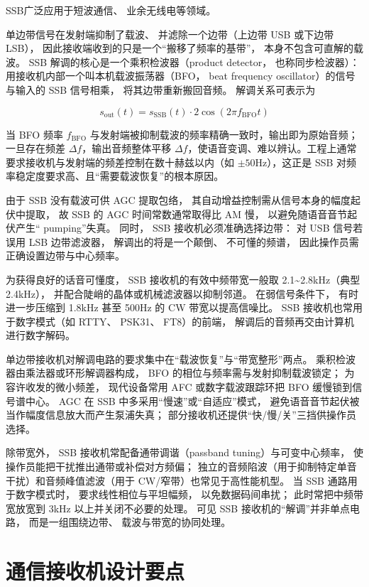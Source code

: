 SSB广泛应用于短波通信、
业余无线电等领域。

单边带信号在发射端抑制了载波、
并滤除一个边带（上边带 USB 或下边带 LSB），
因此接收端收到的只是一个“搬移了频率的基带”，
本身不包含可直解的载波。
SSB 解调的核心是一个乘积检波器（product detector，
也称同步检波器）：
用接收机内部一个叫本机载波振荡器（BFO，
beat frequency oscillator）的信号与输入的 SSB 信号相乘，
将其边带重新搬回音频。
解调关系可表示为

\[
s_{\mathrm{out}}(t)=s_{\mathrm{SSB}}(t)\cdot 2\cos(2\pi f_{\mathrm{BFO}} t)
\]

当 BFO 频率 $f_{\mathrm{BFO}}$ 与发射端被抑制载波的频率精确一致时，输出即为原始音频；一旦存在频差 $\Delta f$，输出音频整体平移 $\Delta f$，使语音变调、难以辨认。工程上通常要求接收机与发射端的频差控制在数十赫兹以内（如 $\pm50$Hz），这正是 SSB 对频率稳定度要求高、且“需要载波恢复”的根本原因。

由于 SSB 没有载波可供 AGC 提取包络，
其自动增益控制需从信号本身的幅度起伏中提取，
故 SSB 的 AGC 时间常数通常取得比 AM 慢，
以避免随语音音节起伏产生“ pumping”失真。
同时，
SSB 接收机必须准确选择边带：
对 USB 信号若误用 LSB 边带滤波器，
解调出的将是一个颠倒、
不可懂的频谱，
因此操作员需正确设置边带与中心频率。

为获得良好的话音可懂度，
SSB 接收机的有效中频带宽一般取 2.1\sim2.8kHz（典型 2.4kHz），
并配合陡峭的晶体或机械滤波器以抑制邻道。
在弱信号条件下，
有时进一步压缩到 1.8kHz 甚至 500Hz 的 CW 带宽以提高信噪比。
SSB 接收机也常用于数字模式（如 RTTY、
PSK31、
FT8）的前端，
解调后的音频再交由计算机进行数字解码。

单边带接收机对解调电路的要求集中在“载波恢复”与“带宽整形”两点。
乘积检波器由乘法器或环形解调器构成，
BFO 的相位与频率需与发射抑制载波锁定；
为容许收发的微小频差，
现代设备常用 AFC 或数字载波跟踪环把 BFO 缓慢锁到信号谱中心。
AGC 在 SSB 中多采用“慢速”或“自适应”模式，
避免语音音节起伏被当作幅度信息放大而产生泵浦失真；
部分接收机还提供“快/慢/关”三挡供操作员选择。

除带宽外，
SSB 接收机常配备通带调谐（passband tuning）与可变中心频率，
使操作员能把干扰推出通带或补偿对方频偏；
独立的音频陷波（用于抑制特定单音干扰）和音频峰值滤波（用于 CW/窄带）也常见于高性能机型。
当 SSB 通路用于数字模式时，
要求线性相位与平坦幅频，
以免数据码间串扰；
此时常把中频带宽放宽到 3kHz 以上并关闭不必要的处理。
可见 SSB 接收机的“解调”并非单点电路，
而是一组围绕边带、
载波与带宽的协同处理。

\section{通信接收机设计要点}
\label{sec:comm_receiver_design}

